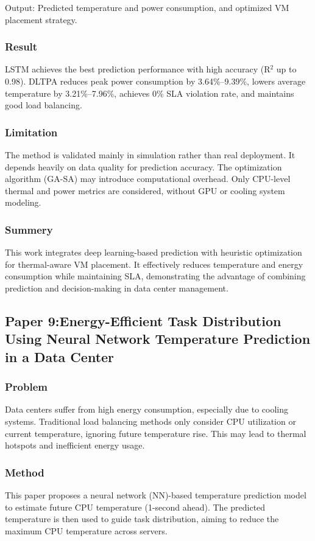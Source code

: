 \documentclass[12pt,a4paper]{article}
\begin{document}
            Output:
            Predicted temperature and power consumption, and optimized VM placement strategy.

    \subsubsection{Result}
                LSTM achieves the best prediction performance with high accuracy (R$^2$ up to 0.98).  
            DLTPA reduces peak power consumption by 3.64\%--9.39\%, lowers average temperature by 3.21\%--7.96\%, achieves 0\% SLA violation rate, and maintains good load balancing.

    \subsubsection{Limitation}
                The method is validated mainly in simulation rather than real deployment.  
            It depends heavily on data quality for prediction accuracy.  
            The optimization algorithm (GA-SA) may introduce computational overhead.  
            Only CPU-level thermal and power metrics are considered, without GPU or cooling system modeling.

    \subsubsection{Summery}
    This work integrates deep learning-based prediction with heuristic optimization for thermal-aware VM placement. It effectively reduces temperature and energy consumption while maintaining SLA, demonstrating the advantage of combining prediction and decision-making in data center management.
\newpage

\subsection{Paper 9:Energy-Efficient Task Distribution Using Neural Network Temperature Prediction in a Data Center}
    \subsubsection{Problem}
    Data centers suffer from high energy consumption, especially due to cooling systems. Traditional load balancing methods only consider CPU utilization or current temperature, ignoring future temperature rise. This may lead to thermal hotspots and inefficient energy usage.


    \subsubsection{Method}
    This paper proposes a neural network (NN)-based temperature prediction model to estimate future CPU temperature (1-second ahead). The predicted temperature is then used to guide task distribution, aiming to reduce the maximum CPU temperature across servers.
    
\end{document}
